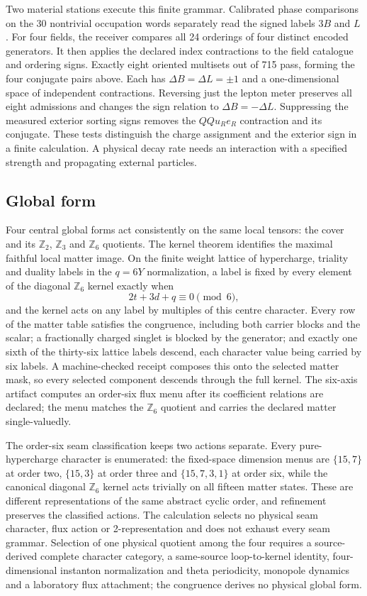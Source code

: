 \documentclass[11pt]{article}
\begin{document}
Two material stations execute this finite grammar. Calibrated
phase comparisons on the 30 nontrivial occupation words separately read
the signed labels $3B$ and $L$. For four fields, the receiver compares
all 24 orderings of four distinct encoded generators. It then applies
the declared index contractions to the field catalogue and ordering
signs. Exactly eight oriented multisets out of 715 pass, forming the
four conjugate pairs above. Each has $\Delta B=\Delta L=\pm1$ and a
one-dimensional space of independent contractions. Reversing just the
lepton meter preserves all eight admissions and changes the sign
relation to $\Delta B=-\Delta L$. Suppressing the measured exterior
sorting signs removes the $QQu_Re_R$ contraction and its conjugate.
These tests distinguish the charge assignment and the exterior sign in
a finite calculation. A physical decay rate needs an interaction with
a specified strength and propagating external particles.

\subsection{Global form}
\label{sec:global-form}\label{thm:global-form-boundary}

Four central global forms act consistently on the same local tensors: the
cover and its \(\mathbb Z_2\), \(\mathbb Z_3\) and \(\mathbb Z_6\) quotients. The
kernel theorem identifies the maximal faithful local matter image. On the
finite weight lattice of hypercharge, triality and duality labels in the
\(q=6Y\) normalization, a label is fixed by every element of the diagonal
\(\mathbb Z_6\) kernel exactly when
\[
2t+3d+q\equiv0\pmod 6 ,
\]
and the kernel acts on any label by multiples of this centre character. Every
row of the matter table satisfies the congruence, including both carrier
blocks and the scalar; a fractionally charged singlet is blocked by the
generator; and exactly one sixth of the thirty-six lattice labels descend,
each character value being carried by six labels. A machine-checked receipt
composes this onto the selected matter mask, so every selected component
descends through the full kernel. The six-axis artifact computes an order-six
flux menu after its coefficient relations are declared; the menu matches the
\(\mathbb Z_6\) quotient and carries the declared matter single-valuedly.

The order-six seam classification keeps two actions separate. Every
pure-hypercharge character is enumerated: the fixed-space dimension menus are
\(\{15,7\}\) at order two, \(\{15,3\}\) at order three and \(\{15,7,3,1\}\) at
order six, while the canonical diagonal \(\mathbb Z_6\) kernel acts trivially
on all fifteen matter states. These are different representations of the
same abstract cyclic order, and refinement preserves the classified actions.
The calculation selects no physical seam character, flux action or
2-representation and does not exhaust every seam grammar. Selection of one
physical quotient among the four requires a source-derived complete character
category, a same-source loop-to-kernel identity, four-dimensional instanton
normalization and theta periodicity, monopole dynamics and a laboratory flux
attachment; the congruence derives no physical global form.
\end{document}
